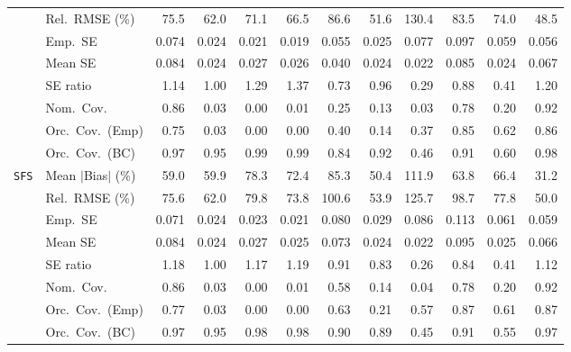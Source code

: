 \begin{landscape}
\begin{longtable}{llrrrrrrrrrr}
 & Rel.\ RMSE (\%) & 75.5 & \cellcolor{rankthree}62.0 & 71.1 & 66.5 & 86.6 & \cellcolor{ranktwo}51.6 & 130.4 & 83.5 & 74.0 & \cellcolor{rankone}48.5 \\
 & Emp.\ SE & 0.074 & 0.024 & 0.021 & 0.019 & 0.055 & 0.025 & 0.077 & 0.097 & 0.059 & 0.056 \\
 & Mean SE & 0.084 & 0.024 & 0.027 & 0.026 & 0.040 & 0.024 & 0.022 & 0.085 & 0.024 & 0.067 \\
 & SE ratio & 1.14 & \cellcolor{rankone}1.00 & 1.29 & 1.37 & 0.73 & \cellcolor{ranktwo}0.96 & 0.29 & \cellcolor{rankthree}0.88 & 0.41 & 1.20 \\
 & Nom.\ Cov. & \cellcolor{ranktwo}0.86 & 0.03 & 0.00 & 0.01 & 0.25 & 0.13 & 0.03 & \cellcolor{rankthree}0.78 & 0.20 & \cellcolor{rankone}0.92 \\
 & Orc.\ Cov.\ (Emp) & \cellcolor{rankthree}0.75 & 0.03 & 0.00 & 0.00 & 0.40 & 0.14 & 0.37 & \cellcolor{ranktwo}0.85 & 0.62 & \cellcolor{rankone}0.86 \\
 & Orc.\ Cov.\ (BC) & \cellcolor{ranktwo}0.97 & \cellcolor{rankone}0.95 & 0.99 & 0.99 & 0.84 & \cellcolor{rankthree}0.92 & 0.46 & 0.91 & 0.60 & \cellcolor{rankthree}0.98 \\
\addlinespace[2pt]
\quad \texttt{SFS} & Mean $|$Bias$|$ (\%) & \cellcolor{rankthree}59.0 & 59.9 & 78.3 & 72.4 & 85.3 & \cellcolor{ranktwo}50.4 & 111.9 & 63.8 & 66.4 & \cellcolor{rankone}31.2 \\
 & Rel.\ RMSE (\%) & 75.6 & \cellcolor{rankthree}62.0 & 79.8 & 73.8 & 100.6 & \cellcolor{ranktwo}53.9 & 125.7 & 98.7 & 77.8 & \cellcolor{rankone}50.0 \\
 & Emp.\ SE & 0.071 & 0.024 & 0.023 & 0.021 & 0.080 & 0.029 & 0.086 & 0.113 & 0.061 & 0.059 \\
 & Mean SE & 0.084 & 0.024 & 0.027 & 0.025 & 0.073 & 0.024 & 0.022 & 0.095 & 0.025 & 0.066 \\
 & SE ratio & 1.18 & \cellcolor{rankone}1.00 & 1.17 & 1.19 & \cellcolor{ranktwo}0.91 & 0.83 & 0.26 & 0.84 & 0.41 & \cellcolor{rankthree}1.12 \\
 & Nom.\ Cov. & \cellcolor{ranktwo}0.86 & 0.03 & 0.00 & 0.01 & 0.58 & 0.14 & 0.04 & \cellcolor{rankthree}0.78 & 0.20 & \cellcolor{rankone}0.92 \\
 & Orc.\ Cov.\ (Emp) & \cellcolor{ranktwo}0.77 & 0.03 & 0.00 & 0.00 & \cellcolor{rankthree}0.63 & 0.21 & 0.57 & \cellcolor{rankone}0.87 & 0.61 & \cellcolor{rankone}0.87 \\
 & Orc.\ Cov.\ (BC) & \cellcolor{ranktwo}0.97 & \cellcolor{rankone}0.95 & \cellcolor{rankthree}0.98 & \cellcolor{rankthree}0.98 & 0.90 & 0.89 & 0.45 & 0.91 & 0.55 & \cellcolor{ranktwo}0.97 \\

\end{longtable}
\end{landscape}
